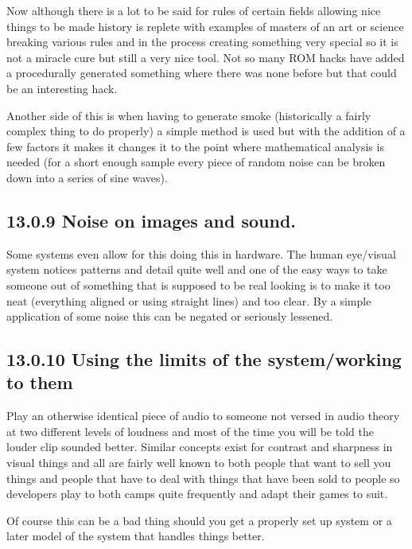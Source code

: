 \documentclass[
]{book}
\begin{document}
Now although there is a lot to be said for rules of certain fields allowing nice things to be made history is replete with examples of masters of an art or science breaking various rules and in the process creating something very special so it is not a miracle cure but still a very nice tool. Not so many ROM hacks have added a procedurally generated something where there was none before but that could be an interesting hack.

Another side of this is when having to generate smoke (historically a fairly complex thing to do properly) a simple method is used but with the addition of a few factors it makes it changes it to the point where mathematical analysis is needed (for a short enough sample every piece of random noise can be broken down into a series of sine waves).

\hypertarget{noise-on-images-and-sound.}{%
\subsection{13.0.9 Noise on images and sound.}\label{noise-on-images-and-sound.}}

Some systems even allow for this doing this in hardware. The human eye/visual system notices patterns and detail quite well and one of the easy ways to take someone out of something that is supposed to be real looking is to make it too neat (everything aligned or using straight lines) and too clear. By a simple application of some noise this can be negated or seriously lessened.

\hypertarget{using-the-limits-of-the-systemworking-to-them}{%
\subsection{13.0.10 Using the limits of the system/working to them}\label{using-the-limits-of-the-systemworking-to-them}}

Play an otherwise identical piece of audio to someone not versed in audio theory at two different levels of loudness and most of the time you will be told the louder clip sounded better. Similar concepts exist for contrast and sharpness in visual things and all are fairly well known to both people that want to sell you things and people that have to deal with things that have been sold to people so developers play to both camps quite frequently and adapt their games to suit.

Of course this can be a bad thing should you get a properly set up system or a later model of the system that handles things better.
\end{document}
